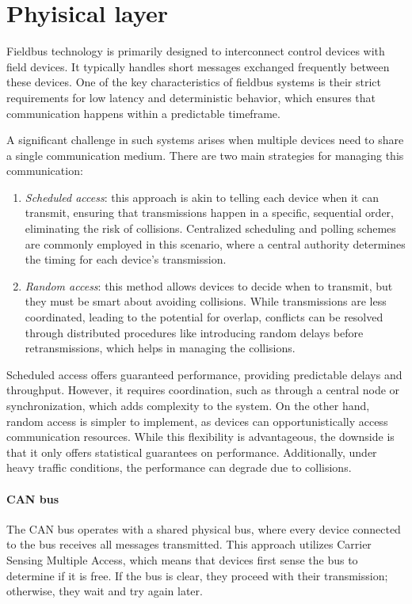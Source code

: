 \section{Phyisical layer}

Fieldbus technology is primarily designed to interconnect control devices with field devices. 
It typically handles short messages exchanged frequently between these devices.
One of the key characteristics of fieldbus systems is their strict requirements for low latency and deterministic behavior, which ensures that communication happens within a predictable timeframe.

A significant challenge in such systems arises when multiple devices need to share a single communication medium.
There are two main strategies for managing this communication:
\begin{enumerate}
    \item \textit{Scheduled access}: this approach is akin to telling each device when it can transmit, ensuring that transmissions happen in a specific, sequential order, eliminating the risk of collisions. 
        Centralized scheduling and polling schemes are commonly employed in this scenario, where a central authority determines the timing for each device's transmission.
    \item \textit{Random access}: this method allows devices to decide when to transmit, but they must be smart about avoiding collisions. 
        While transmissions are less coordinated, leading to the potential for overlap, conflicts can be resolved through distributed procedures like introducing random delays before retransmissions, which helps in managing the collisions.
\end{enumerate}
\noindent Scheduled access offers guaranteed performance, providing predictable delays and throughput. 
However, it requires coordination, such as through a central node or synchronization, which adds complexity to the system. 
On the other hand, random access is simpler to implement, as devices can opportunistically access communication resources. 
While this flexibility is advantageous, the downside is that it only offers statistical guarantees on performance. 
Additionally, under heavy traffic conditions, the performance can degrade due to collisions.

\paragraph*{CAN bus}
The CAN bus operates with a shared physical bus, where every device connected to the bus receives all messages transmitted. 
This approach utilizes Carrier Sensing Multiple Access, which means that devices first sense the bus to determine if it is free. 
If the bus is clear, they proceed with their transmission; otherwise, they wait and try again later.


